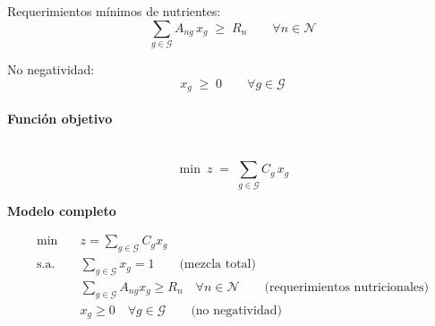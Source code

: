 Requerimientos mínimos de nutrientes:
\begin{equation}
\sum_{g \in \mathcal{G}} A_{ng}\, x_g \;\geq\; R_n
\qquad \forall n \in \mathcal{N}
\end{equation}

No negatividad:
\begin{equation}
x_g \;\geq\; 0 
\qquad \forall g \in \mathcal{G}
\end{equation}

\paragraph{Función objetivo}\mbox{}\\

\begin{equation}
\min\ z \;=\; \sum_{g \in \mathcal{G}} C_g\, x_g
\end{equation}

\textbf{Modelo completo}

\begin{align}
\min \quad & z = \sum_{g \in \mathcal{G}} C_g x_g \\
\text{s.a.} \quad 
& \sum_{g \in \mathcal{G}} x_g = 1 \qquad \text{(mezcla total)} \\
& \sum_{g \in \mathcal{G}} A_{ng} x_g \geq R_n \quad \forall n \in \mathcal{N} \qquad \text{(requerimientos nutricionales)} \\
& x_g \geq 0 \quad \forall g \in \mathcal{G} \qquad \text{(no negatividad)}
\end{align}

